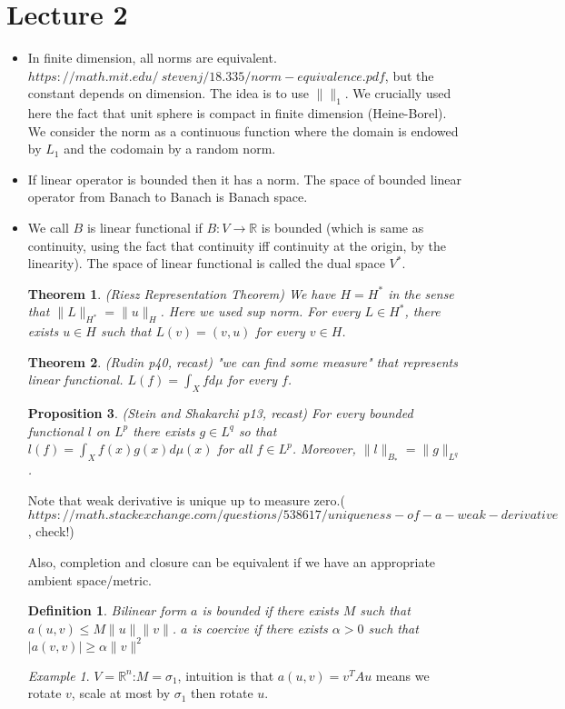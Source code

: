 \documentclass{article}
\newtheorem{theorem}{Theorem}
\newtheorem{proposition}[theorem]{Proposition}
\newtheorem{definition}{Definition}
\theoremstyle{remark}
\newtheorem{example}{Example}
\begin{document}
\section*{Lecture 2}
\begin{itemize}
\item In finite dimension, all norms are equivalent.
$https://math.mit.edu/~stevenj/18.335/norm-equivalence.pdf$, but the constant depends on dimension. The idea is to use $\lVert \rVert_1$. We crucially used here the fact that unit sphere is compact in finite dimension (Heine-Borel). We consider the norm as a continuous function where the domain is endowed by $L_1$ and the codomain by a random norm.
\item If linear operator is bounded then it has a norm. The space of bounded linear operator from Banach to Banach is Banach space.
\item We call $B$ is linear functional if $B:V\to\mathbb{R}$ is bounded (which is same as continuity, using the fact that continuity iff continuity at the origin, by the linearity). The space of linear functional is called the dual space $V^*$.
\begin{theorem} (Riesz Representation Theorem) We have $H=H^*$ in the sense that $\lVert L\rVert_{H^*}=\lVert u\rVert_H$. Here we used sup norm. For every $L\in H^*$, there exists $u\in H$ such that $L(v)=(v,u)$ for every $v\in H$.
\end{theorem}
\begin{theorem}
(Rudin p40, recast) "we can find some measure" that represents linear functional. $L(f)=\int_X f d\mu$ for every $f$.
\end{theorem}
\begin{proposition}
(Stein and Shakarchi p13, recast) For every bounded functional $l$ on $L^p$ there exists $g\in L^q$ so that $l(f)=\int_X f(x)g(x)d\mu (x)$ for all $f\in L^p$. Moreover, $\lVert l\rVert_{B_*}=\lVert g\rVert_{L^q}$.
\end{proposition}
Note that weak derivative is unique up to measure zero.($https://math.stackexchange.com/questions/538617/uniqueness-of-a-weak-derivative$, check!)

Also, completion and closure can be equivalent if we have an appropriate ambient space/metric.

\begin{definition}
Bilinear form $a$ is bounded if there exists $M$ such that $a(u,v)\leq M\lVert u\rVert\lVert v\rVert$. $a$ is coercive if there exists $\alpha>0$ such that $\lvert a(v,v)\rvert\geq\alpha\rVert v\rVert^2$
\end{definition}
\begin{example}
$V=\mathbb{R}^n$:$M=\sigma_1$, intuition is that $a(u,v)=v^T Au$ means we rotate $v$, scale at most by $\sigma_1$ then rotate $u$.


\end{example}
\end{itemize}
\end{document}
